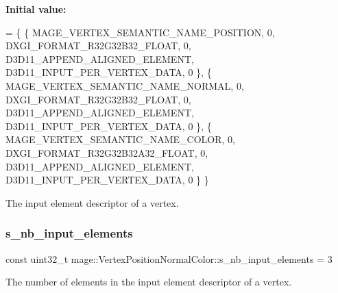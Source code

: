 {\bfseries Initial value\+:}
\begin{DoxyCode}
= \{
        \{ MAGE\_VERTEX\_SEMANTIC\_NAME\_POSITION, 0, DXGI\_FORMAT\_R32G32B32\_FLOAT,    0, 
      D3D11\_APPEND\_ALIGNED\_ELEMENT, D3D11\_INPUT\_PER\_VERTEX\_DATA, 0 \},
        \{ MAGE\_VERTEX\_SEMANTIC\_NAME\_NORMAL,   0, DXGI\_FORMAT\_R32G32B32\_FLOAT,    0, 
      D3D11\_APPEND\_ALIGNED\_ELEMENT, D3D11\_INPUT\_PER\_VERTEX\_DATA, 0 \},
        \{ MAGE\_VERTEX\_SEMANTIC\_NAME\_COLOR,    0, DXGI\_FORMAT\_R32G32B32A32\_FLOAT, 0, 
      D3D11\_APPEND\_ALIGNED\_ELEMENT, D3D11\_INPUT\_PER\_VERTEX\_DATA, 0 \}
    \}
\end{DoxyCode}
The input element descriptor of a vertex. \hypertarget{structmage_1_1_vertex_position_normal_color_ad0030350b1fea5b8383c8e904ca45d51}{}\label{structmage_1_1_vertex_position_normal_color_ad0030350b1fea5b8383c8e904ca45d51} 
\subsubsection{\texorpdfstring{s\+\_\+nb\+\_\+input\+\_\+elements}{s\_nb\_input\_elements}}
{\footnotesize\ttfamily const uint32\+\_\+t mage\+::\+Vertex\+Position\+Normal\+Color\+::s\+\_\+nb\+\_\+input\+\_\+elements = 3\hspace{0.3cm}{\ttfamily [static]}}

The number of elements in the input element descriptor of a vertex. 